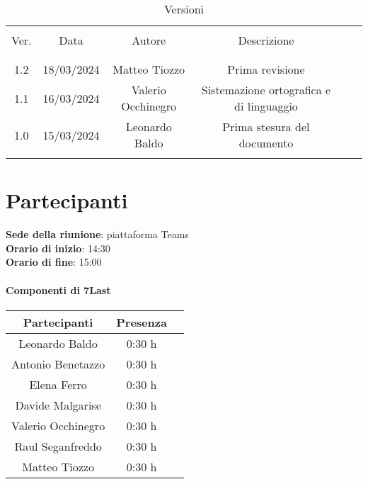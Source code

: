 \documentclass[italian,12pt]{article} %
\begin{document}


\newpage





\begin{table}[!h]
	\caption{Versioni}
	\begin{center}
		\begin{tabular}{ c c c c c c }
			\hline \\[-2ex]
			Ver. & Data & Autore & Descrizione \\
			\\[-2ex] \hline \\[-1.5ex]
			1.2 & 18/03/2024 & Matteo Tiozzo & Prima revisione \\
			1.1 & 16/03/2024 & Valerio Occhinegro& Sistemazione ortografica e di linguaggio \\
			1.0 & 15/03/2024 & Leonardo Baldo& Prima stesura del documento \\
			\\[-1.5ex] \hline
		\end{tabular}
	\end{center}
\end{table}
\newpage

\tableofcontents

\newpage

\section{Partecipanti}

\textbf{Sede della riunione}: piattaforma Teams\\
\textbf{Orario di inizio}: 14:30\\
\textbf{Orario di fine}: 15:00\\


\paragraph{Componenti di 7Last}

\begin{flushleft}
\begin{table}[!h]
\begin{tabular}{ |c|c|c| } 
	\hline
	\textbf{Partecipanti} & \textbf{Presenza} \\
	\hline 
	Leonardo Baldo 		 & 0:30 h \\ 
	Antonio Benetazzo 	 & 0:30 h \\
	Elena Ferro 		 & 0:30 h \\
	Davide Malgarise 	 & 0:30 h \\
	Valerio Occhinegro 	 & 0:30 h \\
	Raul Seganfreddo 	 & 0:30 h \\
	Matteo Tiozzo 		 & 0:30 h \\ 
	\hline
\end{tabular}
\end{table}
\end{flushleft}
\end{document}
